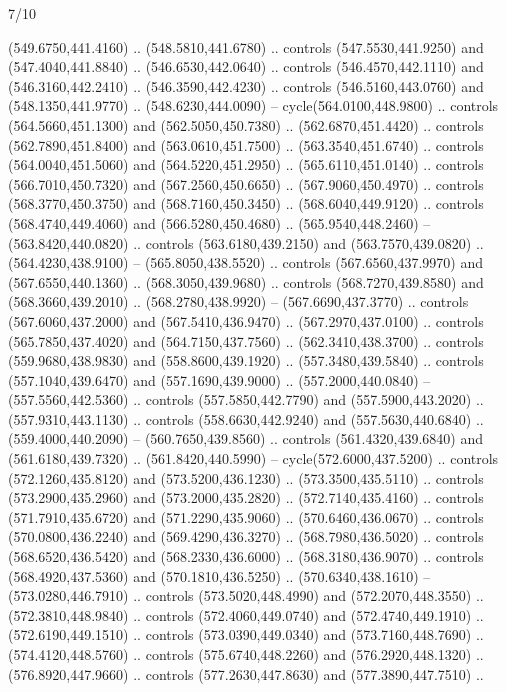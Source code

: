 \begin{flagdescription}{7/10}
\begin{scope}[xshift=0.5\flaglength]
\begin{scope}[scale=0.00185\flagwidth,yshift=245mm,xshift=-43.7mm]
\begin{scope}[y=-0.8pt, x=0.8pt, inner sep=0pt, outer sep=0pt]
\begin{scope}[shift={(-344.0678,183.89831)},fill=brown]
  (549.6750,441.4160) .. (548.5810,441.6780) .. controls (547.5530,441.9250) and
  (547.4040,441.8840) .. (546.6530,442.0640) .. controls (546.4570,442.1110) and
  (546.3160,442.2410) .. (546.3590,442.4230) .. controls (546.5160,443.0760) and
  (548.1350,441.9770) .. (548.6230,444.0090) -- cycle(564.0100,448.9800) ..
  controls (564.5660,451.1300) and (562.5050,450.7380) .. (562.6870,451.4420) ..
  controls (562.7890,451.8400) and (563.0610,451.7500) .. (563.3540,451.6740) ..
  controls (564.0040,451.5060) and (564.5220,451.2950) .. (565.6110,451.0140) ..
  controls (566.7010,450.7320) and (567.2560,450.6650) .. (567.9060,450.4970) ..
  controls (568.3770,450.3750) and (568.7160,450.3450) .. (568.6040,449.9120) ..
  controls (568.4740,449.4060) and (566.5280,450.4680) .. (565.9540,448.2460) --
  (563.8420,440.0820) .. controls (563.6180,439.2150) and (563.7570,439.0820) ..
  (564.4230,438.9100) -- (565.8050,438.5520) .. controls (567.6560,437.9970) and
  (567.6550,440.1360) .. (568.3050,439.9680) .. controls (568.7270,439.8580) and
  (568.3660,439.2010) .. (568.2780,438.9920) -- (567.6690,437.3770) .. controls
  (567.6060,437.2000) and (567.5410,436.9470) .. (567.2970,437.0100) .. controls
  (565.7850,437.4020) and (564.7150,437.7560) .. (562.3410,438.3700) .. controls
  (559.9680,438.9830) and (558.8600,439.1920) .. (557.3480,439.5840) .. controls
  (557.1040,439.6470) and (557.1690,439.9000) .. (557.2000,440.0840) --
  (557.5560,442.5360) .. controls (557.5850,442.7790) and (557.5900,443.2020) ..
  (557.9310,443.1130) .. controls (558.6630,442.9240) and (557.5630,440.6840) ..
  (559.4000,440.2090) -- (560.7650,439.8560) .. controls (561.4320,439.6840) and
  (561.6180,439.7320) .. (561.8420,440.5990) -- cycle(572.6000,437.5200) ..
  controls (572.1260,435.8120) and (573.5200,436.1230) .. (573.3500,435.5110) ..
  controls (573.2900,435.2960) and (573.2000,435.2820) .. (572.7140,435.4160) ..
  controls (571.7910,435.6720) and (571.2290,435.9060) .. (570.6460,436.0670) ..
  controls (570.0800,436.2240) and (569.4290,436.3270) .. (568.7980,436.5020) ..
  controls (568.6520,436.5420) and (568.2330,436.6000) .. (568.3180,436.9070) ..
  controls (568.4920,437.5360) and (570.1810,436.5250) .. (570.6340,438.1610) --
  (573.0280,446.7910) .. controls (573.5020,448.4990) and (572.2070,448.3550) ..
  (572.3810,448.9840) .. controls (572.4060,449.0740) and (572.4740,449.1910) ..
  (572.6190,449.1510) .. controls (573.0390,449.0340) and (573.7160,448.7690) ..
  (574.4120,448.5760) .. controls (575.6740,448.2260) and (576.2920,448.1320) ..
  (576.8920,447.9660) .. controls (577.2630,447.8630) and (577.3890,447.7510) ..

\end{scope}
\end{scope}
\end{scope}
\end{scope}
\end{flagdescription}
